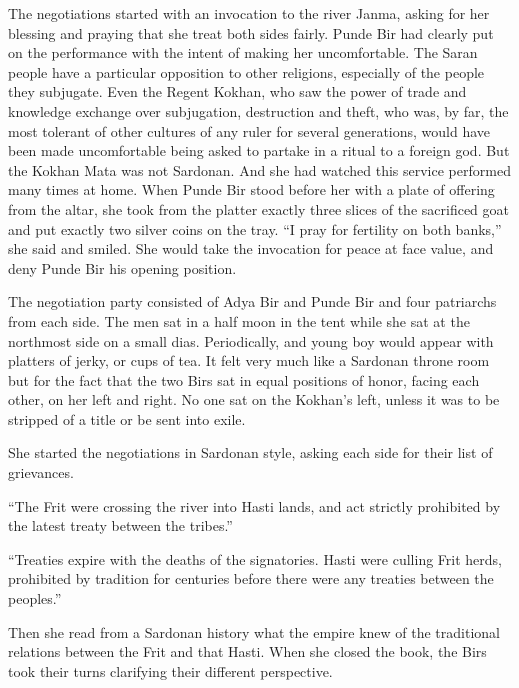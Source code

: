 \documentclass{article}
\begin{document}
	The negotiations started with an invocation to the river Janma, asking for her blessing and praying that she treat both sides fairly. Punde Bir had clearly put on the performance with the intent of making her uncomfortable. The Saran people have a particular opposition to other religions, especially of the people they subjugate. Even the Regent Kokhan, who saw the power of trade and knowledge exchange over subjugation, destruction and theft, who was, by far, the most tolerant of other cultures of any ruler for several generations, would have been made uncomfortable being asked to partake in a ritual to a foreign god. But the Kokhan Mata was not Sardonan. And she had watched this service performed many times at home. When Punde Bir stood before her with a plate of offering from the altar, she took from the platter exactly three slices of the sacrificed goat and put exactly two silver coins on the tray. “I pray for fertility on both banks,” she said and smiled. She would take the invocation for peace at face value, and deny Punde Bir his opening position.
	
	The negotiation party consisted of Adya Bir and Punde Bir and four patriarchs from each side. The men sat in a half moon in the tent while she sat at the northmost side on a small dias. Periodically, and young boy would appear with platters of jerky, or cups of tea. It felt very much like a Sardonan throne room but for the fact that the two Birs sat in equal positions of honor, facing each other, on her left and right. No one sat on the Kokhan’s left, unless it was to be stripped of a title or be sent into exile. 
	
	She started the negotiations in Sardonan style, asking each side for their list of grievances. 
	
	“The Frit were crossing the river into Hasti lands, and act strictly prohibited by the latest treaty between the tribes.”
	
	“Treaties expire with the deaths of the signatories. Hasti were culling Frit herds, prohibited by tradition for centuries before there were any treaties between the peoples.”
	
	Then she read from a Sardonan history what the empire knew of the traditional relations between the Frit and that Hasti. When she closed the book, the Birs took their turns clarifying their different perspective. 
	
\end{document}
